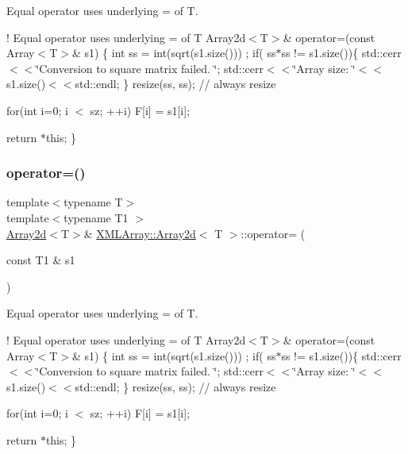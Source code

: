 Equal operator uses underlying = of T. 

! Equal operator uses underlying = of T Array2d$<$\+T$>$\& operator=(const Array$<$\+T$>$\& s1) \{ int ss = int(sqrt(s1.\+size())) ; if( ss$\ast$ss != s1.\+size())\{ std\+::cerr$<$$<$\char`\"{}\+Conversion to square matrix failed. \char`\"{}; std\+::cerr$<$$<$\char`\"{}\+Array size\+: \char`\"{}$<$$<$s1.\+size()$<$$<$std\+::endl; \} resize(ss, ss); // always resize

for(int i=0; i $<$ sz; ++i) F\mbox{[}i\mbox{]} = s1\mbox{[}i\mbox{]};

return $\ast$this; \} \mbox{\label{classXMLArray_1_1Array2d_a2ac560b13ec78975a0cab0b2dcbfe72f}} 
\subsubsection{\texorpdfstring{operator=()}{operator=()}\hspace{0.1cm}{\footnotesize\ttfamily [4/4]}}
{\footnotesize\ttfamily template$<$typename T$>$ \\
template$<$typename T1 $>$ \\
\mbox{\hyperlink{classXMLArray_1_1Array2d}{Array2d}}$<$T$>$\& \mbox{\hyperlink{classXMLArray_1_1Array2d}{X\+M\+L\+Array\+::\+Array2d}}$<$ T $>$\+::operator= (\begin{DoxyParamCaption}\item[{const T1 \&}]{s1 }\end{DoxyParamCaption})\hspace{0.3cm}{\ttfamily [inline]}}



Equal operator uses underlying = of T. 

! Equal operator uses underlying = of T Array2d$<$\+T$>$\& operator=(const Array$<$\+T$>$\& s1) \{ int ss = int(sqrt(s1.\+size())) ; if( ss$\ast$ss != s1.\+size())\{ std\+::cerr$<$$<$\char`\"{}\+Conversion to square matrix failed. \char`\"{}; std\+::cerr$<$$<$\char`\"{}\+Array size\+: \char`\"{}$<$$<$s1.\+size()$<$$<$std\+::endl; \} resize(ss, ss); // always resize

for(int i=0; i $<$ sz; ++i) F\mbox{[}i\mbox{]} = s1\mbox{[}i\mbox{]};

return $\ast$this; \} \mbox{\label{classXMLArray_1_1Array2d_a1e5b7fa596ec682113700320b08e66d5}} 
